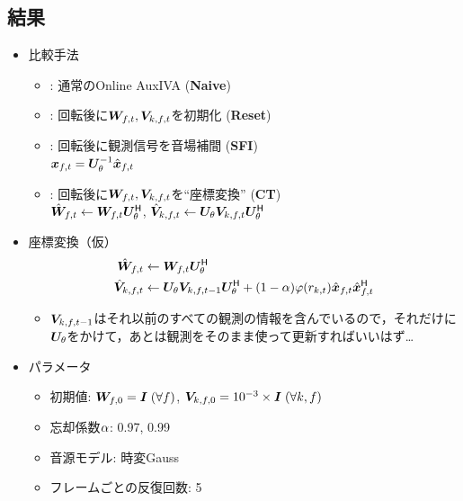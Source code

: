 \documentclass[sip,biber]{now-journal}
\begin{document}
\subsection{結果}
\begin{itemize}
  \item 比較手法
    \begin{itemize}
      \item {}: 通常のOnline AuxIVA (\textbf{Naive})
      \item {}: 回転後に$\Demix _{\ft}, \cov _{\src,\ft}$を初期化 (\textbf{Reset})
      \item {}: 回転後に観測信号を音場補間 (\textbf{SFI})\\
        $\Obs _{\ft} = \rotMat _{\rotDeg} ^{-1} \rotObs _{\ft}$
      \item {}: 回転後に$\Demix _{\ft}, \cov _{\src,\ft}$を``座標変換'' (\textbf{CT})\\
        $\rotDemix _{\ft} \gets \Demix _{\ft} \rotMat _{\rotDeg} ^{\hermite}$,\; $\rotCov _{\src,\ft} \gets \rotMat _{\rotDeg} \cov _{\src,\ft} \rotMat _{\rotDeg} ^{\hermite}$
    \end{itemize}
  \item 座標変換（仮）
    \begin{align*}
      \rotDemix _{\ft} &\gets \Demix _{\ft} \rotMat _{\rotDeg} ^{\hermite} \\
      \rotCov _{\src,\ft} &\gets \rotMat _{\rotDeg} \cov _{\src,\ft[-1]} \rotMat _{\rotDeg} ^{\hermite} + (1 - \forget) \weight(\var _{\src,\tframe}) \rot{\Obs} _{\ft} \rot{\Obs} _{\ft} ^{\hermite}
    \end{align*}
    \begin{itemize}
      \item $\cov _{\src,\ft[-1]}$はそれ以前のすべての観測の情報を含んでいるので，それだけに$\bm{U} _{\theta}$をかけて，あとは観測をそのまま使って更新すればいいはず…
    \end{itemize}
  \item パラメータ
    \begin{itemize}
      \item 初期値: $\bm{W} _{f,0} = \bm{I}\; (\forall f)$, $\bm{V} _{k,f,0} = 10^{-3}\times\bm{I}\; (\forall k, f)$
      \item 忘却係数$\alpha$: 0.97, 0.99
      \item 音源モデル: 時変Gauss
      \item フレームごとの反復回数: 5
    \end{itemize}
\end{itemize}
\end{document}
